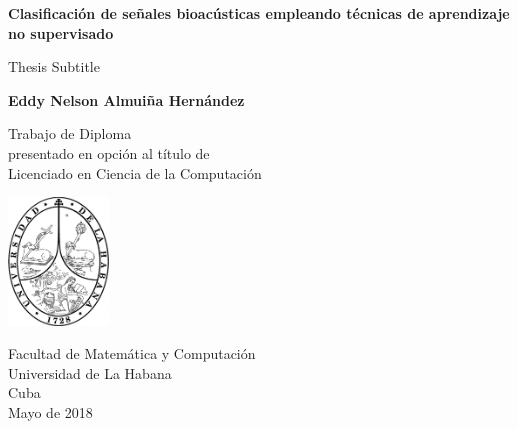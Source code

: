 \documentclass[12pt]{report}
\begin{document}
    \begin{titlepage}
        \begin{center}
            \vspace*{1cm}

            \Huge
            \textbf{Clasificación de señales bioacústicas empleando técnicas de aprendizaje no supervisado}

            \vspace{0.5cm}
            \LARGE
            Thesis Subtitle

            \vspace{1.5cm}

            \textbf{Eddy Nelson Almuiña Hernández}

            \vfill

            Trabajo de Diploma\\
            presentado en opción al título de\\
            Licenciado en Ciencia de la Computación\\

            \vspace{0.8cm}

            \includegraphics[width=0.2\textwidth]{uh.png}

            \Large
            Facultad de Matemática y Computación\\
            Universidad de La Habana\\
            Cuba\\
            Mayo de 2018
        \end{center}
    \end{titlepage}
\end{document}
